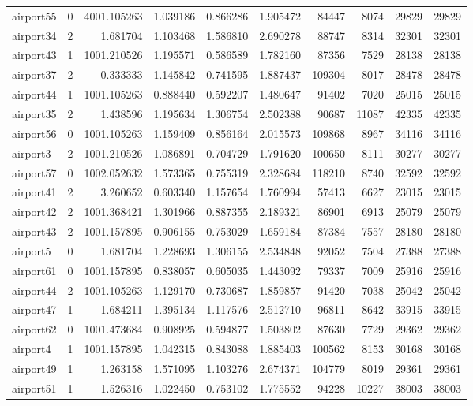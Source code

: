 \begin{longtable}{|l|r|r|r|r|r|r|r|r|r|}
airport55 & 0 & 4001.105263 & 1.039186 & 0.866286 & 1.905472 & 84447 & 8074 & 29829 & 29829 \\
airport34 & 2 & 1.681704 & 1.103468 & 1.586810 & 2.690278 & 88747 & 8314 & 32301 & 32301 \\
airport43 & 1 & 1001.210526 & 1.195571 & 0.586589 & 1.782160 & 87356 & 7529 & 28138 & 28138 \\
airport37 & 2 & 0.333333 & 1.145842 & 0.741595 & 1.887437 & 109304 & 8017 & 28478 & 28478 \\
airport44 & 1 & 1001.105263 & 0.888440 & 0.592207 & 1.480647 & 91402 & 7020 & 25015 & 25015 \\
airport35 & 2 & 1.438596 & 1.195634 & 1.306754 & 2.502388 & 90687 & 11087 & 42335 & 42335 \\
airport56 & 0 & 1001.105263 & 1.159409 & 0.856164 & 2.015573 & 109868 & 8967 & 34116 & 34116 \\
airport3 & 2 & 1001.210526 & 1.086891 & 0.704729 & 1.791620 & 100650 & 8111 & 30277 & 30277 \\
airport57 & 0 & 1002.052632 & 1.573365 & 0.755319 & 2.328684 & 118210 & 8740 & 32592 & 32592 \\
airport41 & 2 & 3.260652 & 0.603340 & 1.157654 & 1.760994 & 57413 & 6627 & 23015 & 23015 \\
airport42 & 2 & 1001.368421 & 1.301966 & 0.887355 & 2.189321 & 86901 & 6913 & 25079 & 25079 \\
airport43 & 2 & 1001.157895 & 0.906155 & 0.753029 & 1.659184 & 87384 & 7557 & 28180 & 28180 \\
airport5 & 0 & 1.681704 & 1.228693 & 1.306155 & 2.534848 & 92052 & 7504 & 27388 & 27388 \\
airport61 & 0 & 1001.157895 & 0.838057 & 0.605035 & 1.443092 & 79337 & 7009 & 25916 & 25916 \\
airport44 & 2 & 1001.105263 & 1.129170 & 0.730687 & 1.859857 & 91420 & 7038 & 25042 & 25042 \\
airport47 & 1 & 1.684211 & 1.395134 & 1.117576 & 2.512710 & 96811 & 8642 & 33915 & 33915 \\
airport62 & 0 & 1001.473684 & 0.908925 & 0.594877 & 1.503802 & 87630 & 7729 & 29362 & 29362 \\
airport4 & 1 & 1001.157895 & 1.042315 & 0.843088 & 1.885403 & 100562 & 8153 & 30168 & 30168 \\
airport49 & 1 & 1.263158 & 1.571095 & 1.103276 & 2.674371 & 104779 & 8019 & 29361 & 29361 \\
airport51 & 1 & 1.526316 & 1.022450 & 0.753102 & 1.775552 & 94228 & 10227 & 38003 & 38003 \\

\end{longtable}
